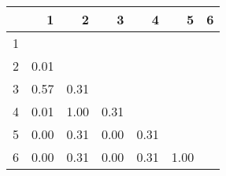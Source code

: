 \begin{tabular}{r|rrrrrr}
  & 1 & 2 & 3 & 4 & 5 & 6 \\ 
  \hline
1 &  &  &  &  &  &  \\ 
  2 & 0.01 &  &  &  &  &  \\ 
  3 & 0.57 & 0.31 &  &  &  &  \\ 
  4 & 0.01 & 1.00 & 0.31 &  &  &  \\ 
  5 & 0.00 & 0.31 & 0.00 & 0.31 &  &  \\ 
  6 & 0.00 & 0.31 & 0.00 & 0.31 & 1.00 &  \\ 
   \hline
\end{tabular}
